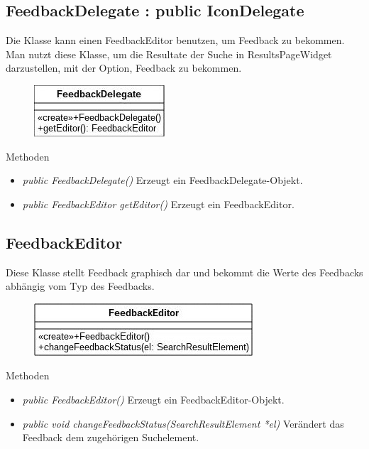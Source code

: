 \subsection*{FeedbackDelegate : public IconDelegate}
Die Klasse kann einen FeedbackEditor benutzen, um Feedback zu bekommen. Man nutzt diese Klasse, um die Resultate der Suche in ResultsPageWidget darzustellen, mit der Option, Feedback zu bekommen. 

\begin{figure}[H]
	\centering
	\includegraphics[scale=0.5]{img/Klassendiagramm/Klassen/View/FeedbackDelegate}
	\label{fig:feedbackDelegate}
\end{figure}

Methoden
\begin{itemize}
	\item\textit{public FeedbackDelegate()}
	Erzeugt ein FeedbackDelegate-Objekt.
	\item\textit{public FeedbackEditor getEditor()}
	Erzeugt ein FeedbackEditor.
\end{itemize}

\subsection*{FeedbackEditor}
Diese Klasse stellt Feedback graphisch dar und bekommt die Werte des Feedbacks abhängig vom Typ des Feedbacks.

\begin{figure}[H]
	\centering
	\includegraphics[scale=0.5]{img/Klassendiagramm/Klassen/View/FeedbackEditor}
	\label{fig:feedbackEditor}
\end{figure}

Methoden
\begin{itemize}
	\item\textit{public FeedbackEditor()}
	Erzeugt ein FeedbackEditor-Objekt.
	\item\textit{public void changeFeedbackStatus(SearchResultElement *el)}
	Verändert das Feedback dem zugehörigen Suchelement.
\end{itemize}

